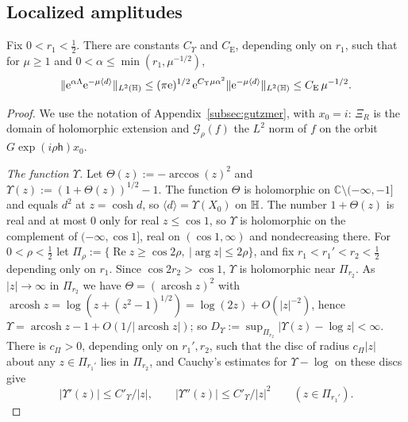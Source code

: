 \subsection{Localized amplitudes}\label{subsec:dd-ex}


\begin{lemma}\label{lem:ex}
Fix $0<r_1<\tfrac12$. There are constants $C_\Upsilon$ and $C_{\mathrm E}$, depending only on $r_1$, such that for $\mu\ge1$ and
$0<\alpha\le\min(r_1,\mu^{-1/2})$,
\[
\lVert \mathrm{e}^{\alpha\Lambda}\mathrm{e}^{-\mu\langle d\rangle}\rVert_{L^2(\mathbb{H})}\le(\pi\mathrm{e})^{1/2}\,\mathrm{e}^{C_\Upsilon\mu\alpha^2}\lVert \mathrm{e}^{-\mu\langle d\rangle}\rVert_{L^2(\mathbb{H})}\le C_{\mathrm E}\,\mu^{-1/2}.
\]
\end{lemma}

\begin{proof}
We use the notation of Appendix~\ref{subsec:gutzmer}, with $x_0=i$: $\Xi_R$ is the domain of holomorphic extension and
$\mathcal G_\rho(f)$ the $L^2$ norm of $f$ on the orbit $G\exp(i\rho\mathsf h)x_0$.

\emph{The function $\Upsilon$.} Let $\Theta(z):=-\arccos(z)^2$ and $\Upsilon(z):=(1+\Theta(z))^{1/2}-1$. The function $\Theta$ is holomorphic on
$\mathbb C\setminus(-\infty,-1]$ and equals $d^2$ at $z=\cosh d$, so $\langle d\rangle=\Upsilon(X_0)$ on $\mathbb{H}$. The number $1+\Theta(z)$ is real and at most $0$ only for
real $z\le\cos1$, so $\Upsilon$ is holomorphic on the complement of $(-\infty,\cos1]$, real on $(\cos1,\infty)$ and nondecreasing there.
For $0<\rho<\tfrac12$ let $\Pi_\rho:=\{\operatorname{Re}z\ge\cos2\rho,\ |\arg z|\le2\rho\}$, and fix $r_1<r_1'<r_2<\tfrac12$ depending only on $r_1$.
Since $\cos2r_2>\cos1$, $\Upsilon$ is holomorphic near $\Pi_{r_2}$. As $|z|\to\infty$ in $\Pi_{r_2}$ we have $\Theta=(\operatorname{arcosh}z)^2$ with
$\operatorname{arcosh}z=\log(z+(z^2-1)^{1/2})=\log(2z)+O(|z|^{-2})$, hence $\Upsilon=\operatorname{arcosh}z-1+O(1/|\operatorname{arcosh}z|)$;
so $D_{\Upsilon}:=\sup_{\Pi_{r_2}}|\Upsilon(z)-\log z|<\infty$. There is $c_\Pi>0$,
depending only on $r_1',r_2$, such that the disc of radius $c_\Pi|z|$ about any $z\in \Pi_{r_1'}$ lies in $\Pi_{r_2}$, and Cauchy's estimates for
$\Upsilon-\log$ on these discs give
\[
|\Upsilon'(z)|\le C'_\Upsilon/|z|,\qquad|\Upsilon''(z)|\le C'_\Upsilon/|z|^2\qquad(z\in \Pi_{r_1'}).
\]


\end{proof}

